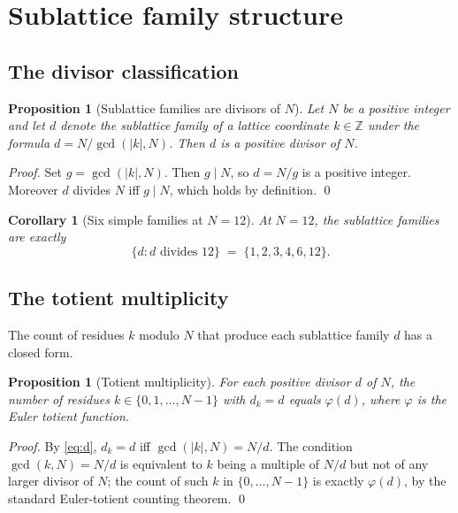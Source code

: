 \documentclass[11pt,a4paper]{article}
\newtheorem{corollary}[theorem]{Corollary}
\newtheorem{proposition}[theorem]{Proposition}
\theoremstyle{definition}
\theoremstyle{remark}
\newcommand{\Z}{\mathbb{Z}}
\begin{document}
\section{Sublattice family structure}\label{sec:sublattice}

\subsection{The divisor classification}

\begin{proposition}[Sublattice families are divisors of $N$]\label{prop:divisors}
Let $N$ be a positive integer and let $d$ denote the sublattice family of a lattice coordinate $k\in\Z$ under the formula $d=N/\gcd(|k|,N)$. Then $d$ is a positive divisor of $N$.
\end{proposition}

\begin{proof}
Set $g=\gcd(|k|,N)$. Then $g\mid N$, so $d = N/g$ is a positive integer. Moreover $d$ divides $N$ iff $g\mid N$, which holds by definition. \qed
\end{proof}

\begin{corollary}[Six simple families at $N=12$]\label{cor:six}
At $N=12$, the sublattice families are exactly
\[
\bigl\{d : d\text{ divides }12\bigr\} \;=\; \{1,2,3,4,6,12\}.
\]
\end{corollary}

\subsection{The totient multiplicity}

The count of residues $k$ modulo $N$ that produce each sublattice family $d$ has a closed form.

\begin{proposition}[Totient multiplicity]\label{prop:totient}
For each positive divisor $d$ of $N$, the number of residues $k\in\{0,1,\ldots,N-1\}$ with $d_{k}=d$ equals $\varphi(d)$, where $\varphi$ is the Euler totient function.
\end{proposition}

\begin{proof}
By \eqref{eq:d}, $d_{k}=d$ iff $\gcd(|k|,N)=N/d$. The condition $\gcd(k,N)=N/d$ is equivalent to $k$ being a multiple of $N/d$ but not of any larger divisor of $N$; the count of such $k$ in $\{0,\ldots,N-1\}$ is exactly $\varphi(d)$, by the standard Euler-totient counting theorem. \qed
\end{proof}
\end{document}
